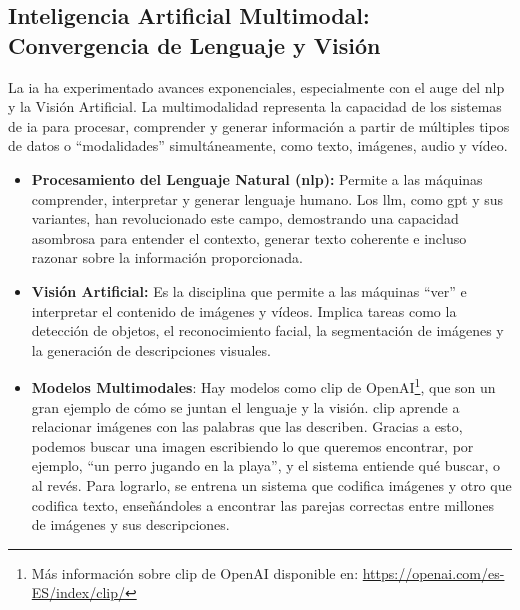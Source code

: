 \subsection{Inteligencia Artificial Multimodal: Convergencia de Lenguaje y Visión}
La \gls{ia} ha experimentado avances exponenciales, especialmente con el auge del \gls{nlp} y la Visión Artificial. La multimodalidad representa la capacidad de los sistemas de \gls{ia} para procesar, comprender y generar información a partir de múltiples tipos de datos o ``modalidades'' simultáneamente, como texto, imágenes, audio y vídeo.
\begin{itemize}
    \item \textbf{Procesamiento del Lenguaje Natural (\gls{nlp}):} Permite a las máquinas comprender, interpretar y generar lenguaje humano. Los \gls{llm}, como \gls{gpt} y sus variantes, han revolucionado este campo, demostrando una capacidad asombrosa para entender el contexto, generar texto coherente e incluso razonar sobre la información proporcionada.
    \item \textbf{Visión Artificial:} Es la disciplina que permite a las máquinas ``ver'' e interpretar el contenido de imágenes y vídeos. Implica tareas como la detección de objetos, el reconocimiento facial, la segmentación de imágenes y la generación de descripciones visuales.
    \item \textbf{Modelos Multimodales}: Hay modelos como \gls{clip} de OpenAI\footnote{Más información sobre \gls{clip} de OpenAI disponible en: \url{https://openai.com/es-ES/index/clip/}}, que son un gran ejemplo de cómo se juntan el lenguaje y la visión. \gls{clip} aprende a relacionar imágenes con las palabras que las describen. Gracias a esto, podemos buscar una imagen escribiendo lo que queremos encontrar, por ejemplo, ``un perro jugando en la playa'', y el sistema entiende qué buscar, o al revés. Para lograrlo, se entrena un sistema que codifica imágenes y otro que codifica texto, enseñándoles a encontrar las parejas correctas entre millones de imágenes y sus descripciones.
\end{itemize}

